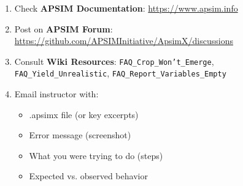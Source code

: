 \begin{enumerate}
  \item Check \textbf{APSIM Documentation}: \url{https://www.apsim.info}
  
  \item Post on \textbf{APSIM Forum}: \url{https://github.com/APSIMInitiative/ApsimX/discussions}
  
  \item Consult \textbf{Wiki Resources}: \texttt{FAQ\_Crop\_Won't\_Emerge}, \texttt{FAQ\_Yield\_Unrealistic}, \texttt{FAQ\_Report\_Variables\_Empty}
  
  \item Email instructor with:
    \begin{itemize}
      \item .apsimx file (or key excerpts)
      \item Error message (screenshot)
      \item What you were trying to do (steps)
      \item Expected vs. observed behavior
    \end{itemize}
\end{enumerate}

